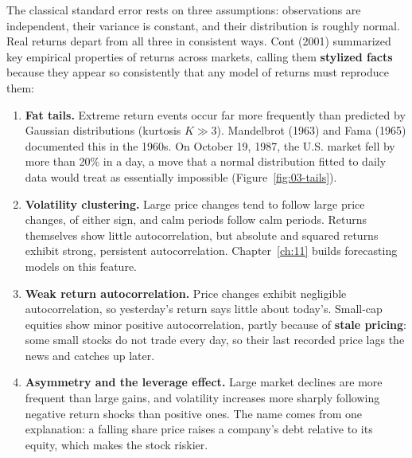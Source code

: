 The classical standard error rests on three assumptions: observations are independent, their variance is constant, and their distribution is roughly normal. Real returns depart from all three in consistent ways. Cont (2001) summarized key empirical properties of returns across markets, calling them \textbf{stylized facts} because they appear so consistently that any model of returns must reproduce them:
\begin{enumerate}
  \item \textbf{Fat tails.} Extreme return events occur far more frequently than predicted by Gaussian distributions (kurtosis $K \gg 3$). Mandelbrot (1963) and Fama (1965) documented this in the 1960s. On October 19, 1987, the U.S. market fell by more than 20\% in a day, a move that a normal distribution fitted to daily data would treat as essentially impossible (Figure~\ref{fig:03-tails}).
  \item \textbf{Volatility clustering.} Large price changes tend to follow large price changes, of either sign, and calm periods follow calm periods. Returns themselves show little autocorrelation, but absolute and squared returns exhibit strong, persistent autocorrelation. Chapter~\ref{ch:11} builds forecasting models on this feature.
  \item \textbf{Weak return autocorrelation.} Price changes exhibit negligible autocorrelation, so yesterday's return says little about today's. Small-cap equities show minor positive autocorrelation, partly because of \textbf{stale pricing}: some small stocks do not trade every day, so their last recorded price lags the news and catches up later.
  \item \textbf{Asymmetry and the leverage effect.} Large market declines are more frequent than large gains, and volatility increases more sharply following negative return shocks than positive ones. The name comes from one explanation: a falling share price raises a company's debt relative to its equity, which makes the stock riskier.
\end{enumerate}

